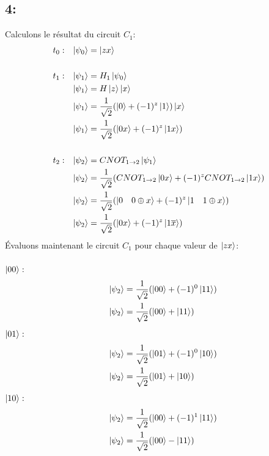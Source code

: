 \documentclass{article}
\begin{document}
\subsection*{4:}
Calculons le résultat du circuit $C_1$:
\begin{align*}
&t_0:&  \ket{\psi_0} &= \ket{zx} \\ \\
&t_1:&  \ket{\psi_1} &= H_1\ket{\psi_0} \\
&&      \ket{\psi_1} &=  H\ket{z}\ket{x} \\
&&      \ket{\psi_1} &= \frac{1}{\sqrt{2}}(\ket{0} + (-1)^z\ket{1})\ket{x} \\
&&      \ket{\psi_1} &= \frac{1}{\sqrt{2}}(\ket{0x} + (-1)^z\ket{1x}) \\ \\
&t_2:&  \ket{\psi_2} &= CNOT_{1 \rightarrow 2}\ket{\psi_1} \\
&&      \ket{\psi_2} &= \frac{1}{\sqrt{2}}(CNOT_{1 \rightarrow 2}\ket{0x} + (-1)^zCNOT_{1 \rightarrow 2}\ket{1x}) \\
&&      \ket{\psi_2} &= \frac{1}{\sqrt{2}}(\ket{0 \quad 0 \oplus x} + (-1)^z\ket{1 \quad 1 \oplus x}) \\
&&      \ket{\psi_2} &= \frac{1}{\sqrt{2}}(\ket{0x} + (-1)^z\ket{1\overline{x}}) \\
\end{align*}
Évaluons maintenant le circuit $C_1$ pour chaque valeur de $\ket{zx}$: \\ \\
$\ket{00}:$ \\
\begin{align*}
&&      \ket{\psi_2} &= \frac{1}{\sqrt{2}}(\ket{00} + (-1)^0\ket{11}) \\
&&      \ket{\psi_2} &= \frac{1}{\sqrt{2}}(\ket{00} + \ket{11})\\
\end{align*}
$\ket{01}:$ \\
\begin{align*}
&&      \ket{\psi_2} &= \frac{1}{\sqrt{2}}(\ket{01} + (-1)^0\ket{10}) \\
&&      \ket{\psi_2} &= \frac{1}{\sqrt{2}}(\ket{01} + \ket{10})\\
\end{align*}
$\ket{10}:$ \\
\begin{align*}
&&      \ket{\psi_2} &= \frac{1}{\sqrt{2}}(\ket{00} + (-1)^1\ket{11}) \\
&&      \ket{\psi_2} &= \frac{1}{\sqrt{2}}(\ket{00} - \ket{11})\\
\end{align*}
\end{document}
